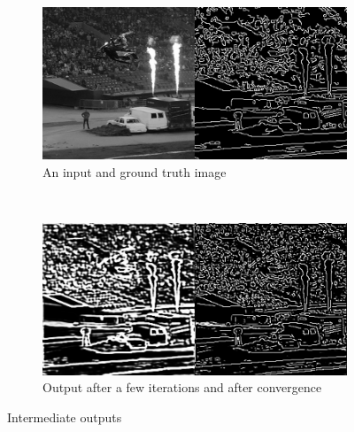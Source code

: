 \documentclass[12pt]{report}
\begin{document}
\begin{figure}
	\centering
	\begin{subfigure}[b]{\linewidth}
		\centering
		\includegraphics[width=0.8\linewidth]{images/out1.png}
		\caption{An input and ground truth image}
	\end{subfigure}
	\\
	\begin{subfigure}[b]{\linewidth}
		\centering
		\includegraphics[width=0.8\linewidth]{images/out2.png}
		\caption{Output after a few iterations and after convergence}
	\end{subfigure}
	\caption{Intermediate outputs}
\end{figure}
\end{document}
